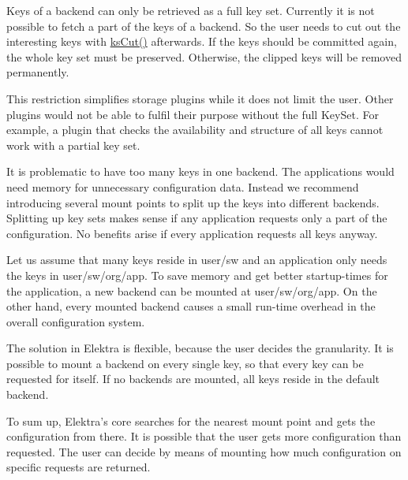 Keys of a backend can only be retrieved as a full key set. Currently it is not possible to fetch a part of the keys of a backend. So the user needs to cut out the interesting keys with {\ttfamily \hyperlink{group__keyset_ga6b00cf82b59af4d883a9bad6cf4a4a4a}{ks\+Cut()}} afterwards. If the keys should be committed again, the whole key set must be preserved. Otherwise, the clipped keys will be removed permanently.

This restriction simplifies storage plugins while it does not limit the user. Other plugins would not be able to fulfil their purpose without the full {\ttfamily Key\+Set}. For example, a plugin that checks the availability and structure of all keys cannot work with a partial key set.

It is problematic to have too many keys in one backend. The applications would need memory for unnecessary configuration data. Instead we recommend introducing several mount points to split up the keys into different backends. Splitting up key sets makes sense if any application requests only a part of the configuration. No benefits arise if every application requests all keys anyway.

Let us assume that many keys reside in {\ttfamily user/sw} and an application only needs the keys in {\ttfamily user/sw/org/app}. To save memory and get better startup-\/times for the application, a new backend can be mounted at {\ttfamily user/sw/org/app}. On the other hand, every mounted backend causes a small run-\/time overhead in the overall configuration system.

The solution in Elektra is flexible, because the user decides the granularity. It is possible to mount a backend on every single key, so that every key can be requested for itself. If no backends are mounted, all keys reside in the default backend.

To sum up, Elektra’s core searches for the nearest mount point and gets the configuration from there. It is possible that the user gets more configuration than requested. The user can decide by means of mounting how much configuration on specific requests are returned. 